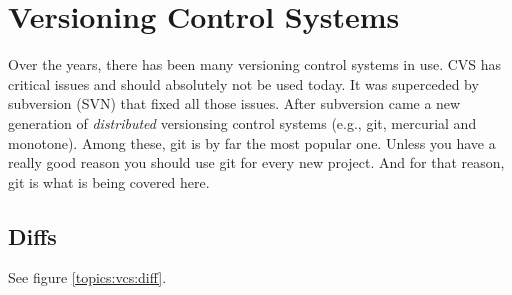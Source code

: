 \section{Versioning Control Systems}


Over the years, there has been many versioning control systems in use. CVS has critical issues and should absolutely not be used today. It was superceded by subversion (SVN) that fixed all those issues. After subversion came a new generation of \textsl{distributed} versionsing control systems (e.g., git, mercurial and monotone). Among these, git is by far the most popular one. Unless you have a really good reason you should use git for every new project. And for that reason, git is what is being covered here.

\subsection{Diffs}

See figure \ref{topics:vcs:diff}.

